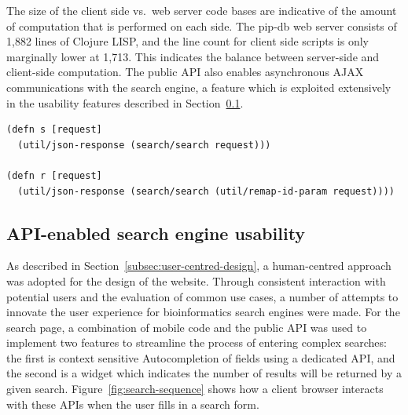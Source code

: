 The size of the client side vs.\ web server code bases are indicative
of the amount of computation that is performed on each side. The
pip-db web server consists of 1,882 lines of Clojure LISP, and the
line count for client side scripts is only marginally lower at
1,713. This indicates the balance between server-side and client-side
computation. The public API also enables asynchronous AJAX
communications with the search engine, a feature which is exploited
extensively in the usability features described in
Section~\ref{subsec:ux}.\\


\lstset{language=clojure}
\begin{lstlisting}[label=lst:api-handlers,caption={%
      [API ring handler implementations]
       API ring handler implementations, taken from \texttt{api.clj}.}]
(defn s [request]
  (util/json-response (search/search request)))

(defn r [request]
  (util/json-response (search/search (util/remap-id-param request))))
\end{lstlisting}


\subsection{API-enabled search engine usability}\label{subsec:ux}

As described in Section~\ref{subsec:user-centred-design}, a
human-centred approach was adopted for the design of the
website. Through consistent interaction with potential users and the
evaluation of common use cases, a number of attempts to innovate the
user experience for bioinformatics search engines were made. For the
search page, a combination of mobile code and the public API was used
to implement two features to streamline the process of entering
complex searches: the first is context sensitive Autocompletion of
fields using a dedicated API, and the second is a widget which
indicates the number of results will be returned by a given
search. Figure~\ref{fig:search-sequence} shows how a client browser
interacts with these APIs when the user fills in a search form.


